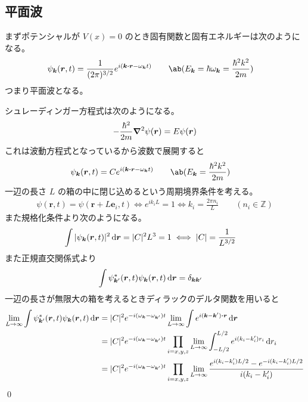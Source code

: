 \documentclass[uplatex,dvipdfmx,a4paper,11pt]{jlreq}
\makeatletter
\newcommand{\ZZ}{\mathbb{Z}}
\newcommand{\rr}{\bm{r}}
\newcommand{\kk}{\bm{k}}
\numberwithin{equation}{section}
\theoremstyle{definition}
\renewenvironment{proof}[1][\proofname]{\par
  \normalfont
  \topsep6\p@\@plus6\p@ \trivlist
  \item[\hskip\labelsep{\bfseries #1}\@addpunct{\bfseries}]\ignorespaces\quad\par
}{%
  \qed\endtrivlist\@endpefalse
}
\renewcommand\proofname{証明}
\makeatother
\begin{document}
\subsection{平面波}
\begin{proposition}
  まずポテンシャルが $V(x) = 0$ のとき固有関数と固有エネルギーは次のようになる。
  \begin{align}
    \psi_{\kk}(\rr, t) & = \frac{1}{(2\pi)^{3/2}}e^{i(\kk\vdot\rr - \omega_{\kk}t)} \qquad \ab(E_{\kk} = \hbar\omega_{\kk} = \frac{\hbar^2k^2}{2m})
  \end{align}
  つまり平面波となる。
\end{proposition}
\begin{proof}
  シュレーディンガー方程式は次のようになる。
  \begin{align}
    -\frac{\hbar^2}{2m}\vnabla^2\psi(\rr) = E\psi(\rr)
  \end{align}
  これは波動方程式となっているから波数で展開すると
  \begin{align}
    \psi_{\kk}(\rr, t) & = Ce^{i(\kk\vdot\rr - \omega_{\kk}t)} \qquad \ab(E_{\kk} = \frac{\hbar^2k^2}{2m})
  \end{align}
  一辺の長さ $L$ の箱の中に閉じ込めるという周期境界条件を考える。
  \begin{align}
    \psi(\rr, t) = \psi(\rr + L\bm{e}_i, t) \iff e^{ik_iL} = 1 \iff k_i = \frac{2\pi n_i}{L} \qquad (n_i\in\ZZ)
  \end{align}
  また規格化条件より次のようになる。
  \begin{align}
    \int|\psi_{\kk}(\rr, t)|^2\dl{\rr} = |C|^2L^3 = 1 \iff |C| & = \frac{1}{L^{3/2}}
  \end{align}
  また正規直交関係式より
  \begin{align}
    \int\psi_{\kk'}^*(\rr, t)\psi_{\kk}(\rr, t)\dl{\rr} & = \delta_{\kk\kk'}
  \end{align}
  一辺の長さが無限大の箱を考えるときディラックのデルタ関数を用いると
  \begin{align}
    \lim_{L\to\infty}\int\psi_{\kk'}^*(\rr, t)\psi_{\kk}(\rr, t)\dl{\rr} & = |C|^2e^{-i(\omega_{\kk} - \omega_{\kk'})t}\lim_{L\to\infty}\int e^{i(\kk - \kk')\vdot\rr}\dl{\rr}                                            \\
                                                                         & = |C|^2e^{-i(\omega_{\kk} - \omega_{\kk'})t}\prod_{i=x,y,z}\lim_{L\to\infty}\int_{-L/2}^{L/2} e^{i(k_i - k_i')r_i}\dl{r_i}                     \\
                                                                         & = |C|^2e^{-i(\omega_{\kk} - \omega_{\kk'})t}\prod_{i=x,y,z}\lim_{L\to\infty}\frac{e^{i(k_i - k_i')L/2} - e^{-i(k_i - k_i')L/2}}{i(k_i - k_i')} \\

\end{align}
\end{proof}
\end{document}

